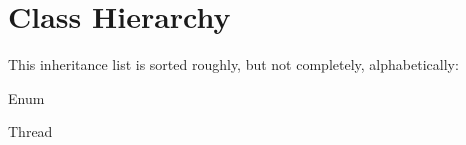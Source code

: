 \section{Class Hierarchy}
This inheritance list is sorted roughly, but not completely, alphabetically\+:\begin{DoxyCompactList}
\item Enum\begin{DoxyCompactList}
\item {}
\end{DoxyCompactList}
\item Thread\begin{DoxyCompactList}
\item {}
\end{DoxyCompactList}
\end{DoxyCompactList}
